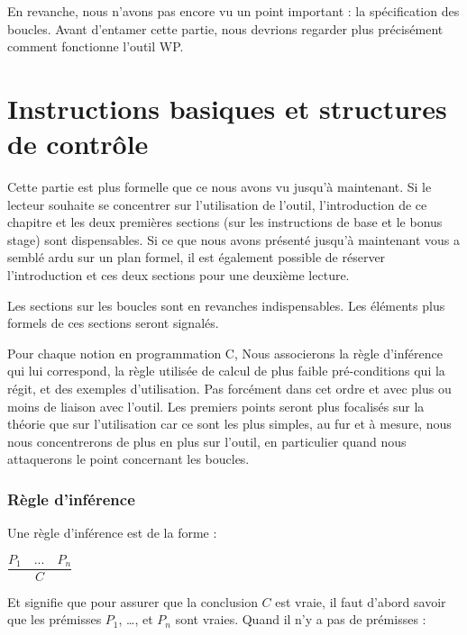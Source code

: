 \documentclass[12pt,francais,]{scrbook}
\newenvironment{zdsblock}[1]{%
  \tcolorbox[beamer,%
    noparskip,breakable,
    colback=LightBlue,colframe=DarkBlue,%
    colbacklower=DarkBlue,%
    title=#1]
}{\endtcolorbox}
\begin{document}
En revanche, nous n'avons pas encore vu un point important : la
spécification des boucles. Avant d'entamer cette partie, nous devrions
regarder plus précisément comment fonctionne l'outil WP.

\chapter{Instructions basiques et structures de
contrôle}\label{instructions-basiques-et-structures-de-contruxf4le}

\begin{zdsblock}{Information}
  Cette partie est plus formelle que ce
  nous avons vu jusqu'à maintenant. Si le lecteur souhaite se
  concentrer sur l'utilisation de l'outil, l'introduction de ce
  chapitre et les deux premières sections (sur les instructions de base et
  \og{}le bonus stage\fg{}) sont dispensables. Si ce que nous avons
  présenté jusqu'à maintenant vous a semblé ardu sur un plan
  formel, il est également possible de réserver l'introduction
  et ces deux sections pour une deuxième lecture.
  
  Les sections sur les boucles sont en revanches indispensables. Les
  éléments plus formels de ces sections seront signalés.
\end{zdsblock}
  
Pour chaque notion en programmation C, Nous associerons la règle
d'inférence qui lui correspond, la règle utilisée de calcul de plus
faible pré-conditions qui la régit, et des exemples d'utilisation. Pas
forcément dans cet ordre et avec plus ou moins de liaison avec l'outil.
Les premiers points seront plus focalisés sur la théorie que sur
l'utilisation car ce sont les plus simples, au fur et à mesure, nous
nous concentrerons de plus en plus sur l'outil, en particulier quand
nous attaquerons le point concernant les boucles.

\subsection{Règle d'inférence}\label{ruxe8gle-dinfuxe9rence}

Une règle d'inférence est de la forme :

\begin{center} \(\dfrac{P_1 \quad ... \quad P_n}{C}\) \end{center}

Et signifie que pour assurer que la conclusion \(C\) est vraie, il faut
d'abord savoir que les prémisses \(P_1\), \ldots{}, et \(P_n\) sont
vraies. Quand il n'y a pas de prémisses :
\end{document}
